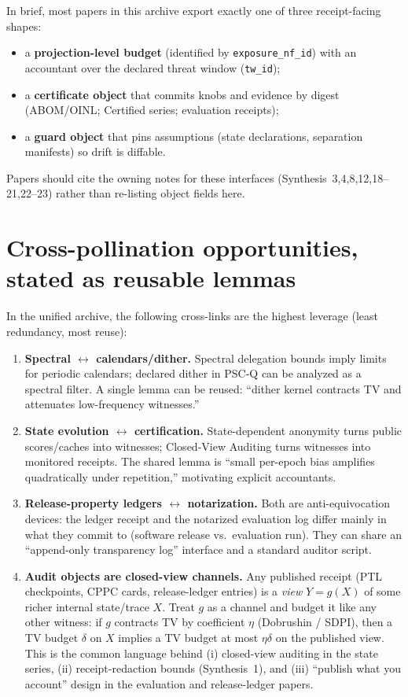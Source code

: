 \documentclass[11pt]{article}
\begin{document}
In brief, most papers in this archive export exactly one of three receipt-facing shapes:
\begin{itemize}[leftmargin=*]
\item a \textbf{projection-level budget} (identified by \texttt{exposure\_nf\_id}) with an accountant over the declared threat window (\texttt{tw\_id});
\item a \textbf{certificate object} that commits knobs and evidence by digest (ABOM/OINL; Certified series; evaluation receipts);
\item a \textbf{guard object} that pins assumptions (state declarations, separation manifests) so drift is diffable.
\end{itemize}

Papers should cite the owning notes for these interfaces (Synthesis~3,4,8,12,18--21,22--23) rather than re-listing object fields here.

\section{Cross-pollination opportunities, stated as reusable lemmas}

In the unified archive, the following cross-links are the highest leverage (least redundancy, most reuse):
\begin{enumerate}[leftmargin=*]
\item \textbf{Spectral $\leftrightarrow$ calendars/dither.}
Spectral delegation bounds imply limits for periodic calendars; declared dither in PSC-Q can be analyzed as a spectral filter.
A single lemma can be reused: ``dither kernel contracts TV and attenuates low-frequency witnesses.''
\item \textbf{State evolution $\leftrightarrow$ certification.}
State-dependent anonymity turns public scores/caches into witnesses; Closed-View Auditing turns witnesses into monitored receipts.
The shared lemma is ``small per-epoch bias amplifies quadratically under repetition,'' motivating explicit accountants.
\item \textbf{Release-property ledgers $\leftrightarrow$ notarization.}
Both are anti-equivocation devices: the ledger receipt and the notarized evaluation log differ mainly in what they commit to (software release vs.\ evaluation run).
They can share an ``append-only transparency log'' interface and a standard auditor script.
\item \textbf{Audit objects are closed-view channels.}
Any published receipt (PTL checkpoints, CPPC cards, release-ledger entries) is a \emph{view} $Y=g(X)$ of some richer internal state/trace $X$.
Treat $g$ as a channel and budget it like any other witness: if $g$ contracts TV by coefficient $\eta$ (Dobrushin / SDPI), then a TV budget $\delta$ on $X$ implies a TV budget at most $\eta\delta$ on the published view.
This is the common language behind (i) closed-view auditing in the state series, (ii) receipt-redaction bounds (Synthesis~1), and (iii) ``publish what you account'' design in the evaluation and release-ledger papers.
\end{enumerate}
\end{document}
